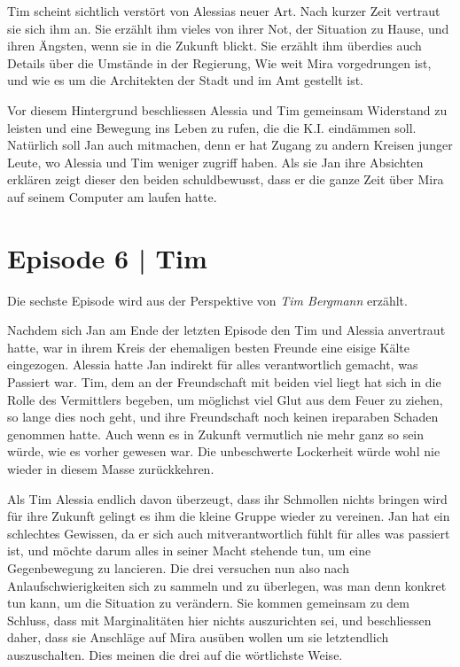 \documentclass[11pt,a4paper,ngerman]{scrreprt}
\begin{document}
Tim scheint sichtlich verstört von Alessias neuer Art. Nach kurzer Zeit
vertraut sie sich ihm an. Sie erzählt ihm vieles von ihrer Not, der Situation
zu Hause, und ihren Ängsten, wenn sie in die Zukunft blickt. Sie erzählt ihm
überdies auch Details über die Umstände in der Regierung, Wie weit Mira
vorgedrungen ist, und wie es um die Architekten der Stadt und im Amt gestellt
ist.

Vor diesem Hintergrund beschliessen Alessia und Tim gemeinsam Widerstand zu
leisten und eine Bewegung ins Leben zu rufen, die die K.I. eindämmen
soll. Natürlich soll Jan auch mitmachen, denn er hat Zugang zu andern Kreisen
junger Leute, wo Alessia und Tim weniger zugriff haben. Als sie Jan ihre
Absichten erklären zeigt dieser den beiden schuldbewusst, dass er die ganze
Zeit über Mira auf seinem Computer am laufen hatte.

\section*{Episode 6 | Tim}

Die sechste Episode wird aus der Perspektive von \emph{Tim Bergmann} erzählt.

Nachdem sich Jan am Ende der letzten Episode den Tim und Alessia anvertraut
hatte, war in ihrem Kreis der ehemaligen besten Freunde eine eisige Kälte
eingezogen. Alessia hatte Jan indirekt für alles verantwortlich gemacht, was
Passiert war. Tim, dem an der Freundschaft mit beiden viel liegt hat sich in
die Rolle des Vermittlers begeben, um möglichst viel Glut aus dem Feuer zu
ziehen, so lange dies noch geht, und ihre Freundschaft noch keinen ireparaben
Schaden genommen hatte. Auch wenn es in Zukunft vermutlich nie mehr ganz so
sein würde, wie es vorher gewesen war. Die unbeschwerte Lockerheit würde wohl
nie wieder in diesem Masse zurückkehren.

Als Tim Alessia endlich davon überzeugt, dass ihr Schmollen nichts bringen
wird für ihre Zukunft gelingt es ihm die kleine Gruppe wieder zu
vereinen. Jan hat ein schlechtes Gewissen, da er sich auch mitverantwortlich
fühlt für alles was passiert ist, und möchte darum alles in seiner Macht
stehende tun, um eine Gegenbewegung zu lancieren. Die drei versuchen nun also
nach Anlaufschwierigkeiten sich zu sammeln und zu überlegen, was man denn
konkret tun kann, um die Situation zu verändern. Sie kommen gemeinsam zu dem
Schluss, dass mit Marginalitäten hier nichts auszurichten sei, und
beschliessen daher, dass sie Anschläge auf Mira ausüben wollen um sie
letztendlich auszuschalten. Dies meinen die drei auf die wörtlichste Weise.
\end{document}

